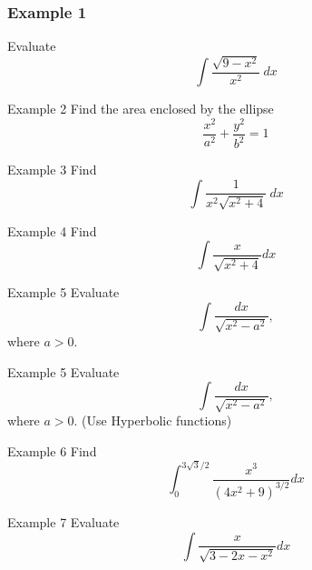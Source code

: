 \documentclass{beamer}
\begin{document}
\begin{frame}
    \frametitle{Example 1}
Evaluate \[\int \dfrac{\sqrt{9-x^2}}{x^2}~dx\]
\end{frame}

\begin{frame}{Example 2}
    Find the area enclosed by the ellipse \[\dfrac{x^2}{a^2}+ \dfrac{y^2}{b^2}=1\]
\end{frame}

\begin{frame}{Example 3}
    Find \[\int \dfrac{1}{x^2 \sqrt{x^2+4}}~dx\]
\end{frame}

\begin{frame}{Example 4}
    Find \[\int \dfrac{x}{\sqrt{x^2+4}}dx\]
\end{frame}

\begin{frame}{Example 5}
    Evaluate \[\int \dfrac{dx}{\sqrt{x^2-a^2}},\] where \(a>0\).
    
\end{frame}

\begin{frame}{Example 5}
    Evaluate \[\int \dfrac{dx}{\sqrt{x^2-a^2}},\] where \(a>0\). (Use Hyperbolic functions)
    
\end{frame}

\begin{frame}{Example 6}
    Find \[\int_{0}^{3\sqrt{3}/2}\dfrac{x^3}{(4x^2+9)^{3/2}}dx\]
\end{frame}

\begin{frame}{Example 7}
    Evaluate \[\int \dfrac{x}{\sqrt{3-2x-x^2}}dx\]
\end{frame}
\end{document}
